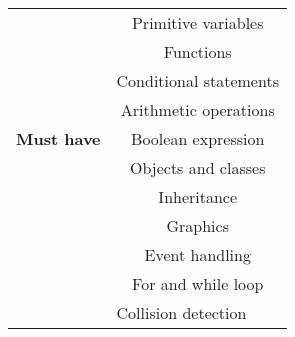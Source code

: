 \begin{table}[H]
\centering
\begin{tabular}{|l|c|}
\hline
\rowcolor[HTML]{34FF34} 
                                                                  & \cellcolor[HTML]{32CB00}Primitive variables                       \\ \cline{2-2} 
\rowcolor[HTML]{34FF34} 
                                                                  & Functions                                                         \\ \cline{2-2} 
\rowcolor[HTML]{34FF34} 
\textbf{}                                                         & \cellcolor[HTML]{32CB00}Conditional statements                    \\ \cline{2-2} 
\rowcolor[HTML]{34FF34} 
                                                                  & Arithmetic operations                                             \\ \cline{2-2} 
\rowcolor[HTML]{34FF34} 
\textbf{Must have}                                                & \cellcolor[HTML]{32CB00}Boolean expression                        \\ \cline{2-2} 
\rowcolor[HTML]{34FF34} 
                                                                  & Objects and classes                                               \\ \cline{2-2} 
\rowcolor[HTML]{34FF34} 
                                                                  & \cellcolor[HTML]{32CB00}Inheritance                               \\ \cline{2-2} 
\rowcolor[HTML]{34FF34} 
                                                                  & Graphics                                                          \\ \cline{2-2} 
\rowcolor[HTML]{34FF34} 
                                                                  & \cellcolor[HTML]{32CB00}Event handling                            \\ \cline{2-2} 
\rowcolor[HTML]{34FF34} 
                                                                  & For and while loop                                                \\ \hline
\rowcolor[HTML]{34CDF9} 
                                                                  & \multicolumn{1}{l|}{\cellcolor[HTML]{85A4FB}Collision detection}  \\ \cline{2-2} 

\end{tabular}
\end{table}
